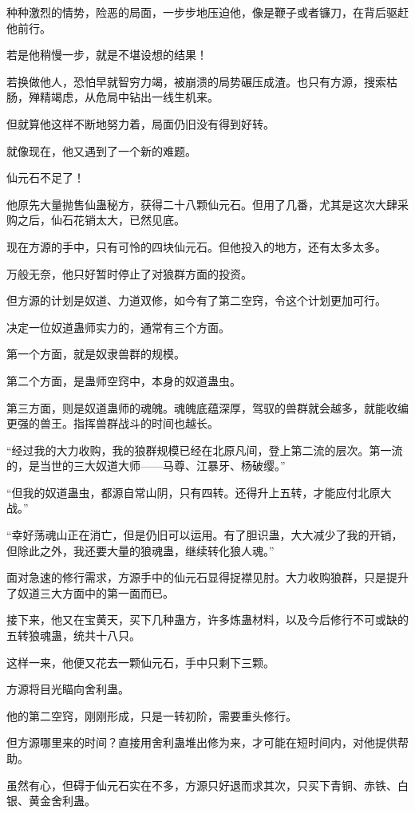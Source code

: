\begin{this_body}
种种激烈的情势，险恶的局面，一步步地压迫他，像是鞭子或者镰刀，在背后驱赶他前行。

若是他稍慢一步，就是不堪设想的结果！

若换做他人，恐怕早就智穷力竭，被崩溃的局势碾压成渣。也只有方源，搜索枯肠，殚精竭虑，从危局中钻出一线生机来。

但就算他这样不断地努力着，局面仍旧没有得到好转。

就像现在，他又遇到了一个新的难题。

仙元石不足了！

他原先大量抛售仙蛊秘方，获得二十八颗仙元石。但用了几番，尤其是这次大肆采购之后，仙石花销太大，已然见底。

现在方源的手中，只有可怜的四块仙元石。但他投入的地方，还有太多太多。

万般无奈，他只好暂时停止了对狼群方面的投资。

但方源的计划是奴道、力道双修，如今有了第二空窍，令这个计划更加可行。

决定一位奴道蛊师实力的，通常有三个方面。

第一个方面，就是奴隶兽群的规模。

第二个方面，是蛊师空窍中，本身的奴道蛊虫。

第三方面，则是奴道蛊师的魂魄。魂魄底蕴深厚，驾驭的兽群就会越多，就能收编更强的兽王。指挥兽群战斗的时间也越长。

“经过我的大力收购，我的狼群规模已经在北原凡间，登上第二流的层次。第一流的，是当世的三大奴道大师——马尊、江暴牙、杨破缨。”

“但我的奴道蛊虫，都源自常山阴，只有四转。还得升上五转，才能应付北原大战。”

“幸好荡魂山正在消亡，但是仍旧可以运用。有了胆识蛊，大大减少了我的开销，但除此之外，我还要大量的狼魂蛊，继续转化狼人魂。”

面对急速的修行需求，方源手中的仙元石显得捉襟见肘。大力收购狼群，只是提升了奴道三大方面中的第一面而已。

接下来，他又在宝黄天，买下几种蛊方，许多炼蛊材料，以及今后修行不可或缺的五转狼魂蛊，统共十八只。

这样一来，他便又花去一颗仙元石，手中只剩下三颗。

方源将目光瞄向舍利蛊。

他的第二空窍，刚刚形成，只是一转初阶，需要重头修行。

但方源哪里来的时间？直接用舍利蛊堆出修为来，才可能在短时间内，对他提供帮助。

虽然有心，但碍于仙元石实在不多，方源只好退而求其次，只买下青铜、赤铁、白银、黄金舍利蛊。


\end{this_body}
